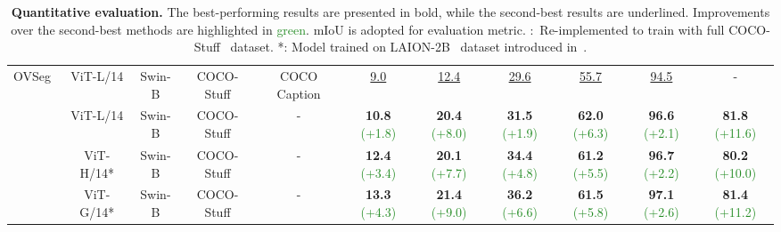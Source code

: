 \documentclass[10pt,twocolumn,letterpaper]{article}
\newcommand{\hlrow}{\rowcolor{black!6}}
\newcommand{\ours}{CAT-Seg\xspace}
\begin{document}
\begin{table*}[!t]
\begin{center}
{\begin{tabular}{l|cccc|cccccc}
        OVSeg~\cite{liang2022open} & ViT-L/14 & Swin-B & COCO-Stuff & COCO Caption & \underline{9.0} & \underline{12.4} & \underline{29.6} & \underline{55.7} & \underline{94.5} & - \\
        \hlrow 
        & ViT-L/14 & Swin-B & COCO-Stuff & -& \textbf{10.8} \textcolor{ForestGreen}{(+1.8)} & \textbf{20.4} \textcolor{ForestGreen}{(+8.0)} & \textbf{31.5} \textcolor{ForestGreen}{(+1.9)} & \textbf{62.0} \textcolor{ForestGreen}{(+6.3)} & \textbf{96.6} \textcolor{ForestGreen}{(+2.1)} & \textbf{81.8} \textcolor{ForestGreen}{(+11.6)}\\
        \hlrow & ViT-H/14* & Swin-B & COCO-Stuff & - & \textbf{12.4} \textcolor{ForestGreen}{(+3.4)} & \textbf{20.1} \textcolor{ForestGreen}{(+7.7)} & \textbf{34.4} \textcolor{ForestGreen}{(+4.8)} & \textbf{61.2} \textcolor{ForestGreen}{(+5.5)} & \textbf{96.7} \textcolor{ForestGreen}{(+2.2)} & \textbf{80.2} \textcolor{ForestGreen}{(+10.0)}\\

        \hlrow \multirow{-3}{*}{\ours (ours)} & ViT-G/14* & Swin-B & COCO-Stuff & - & \textbf{13.3} \textcolor{ForestGreen}{(+4.3)} & \textbf{21.4} \textcolor{ForestGreen}{(+9.0)} & \textbf{36.2} \textcolor{ForestGreen}{(+6.6)} & \textbf{61.5} \textcolor{ForestGreen}{(+5.8)} & \textbf{97.1} \textcolor{ForestGreen}{(+2.6)} & \textbf{81.4} \textcolor{ForestGreen}{(+11.2)}\\
        \bottomrule
    \end{tabular}
    }
    \vspace{-5pt}
    \caption{\textbf{Quantitative evaluation.} The best-performing results are presented in bold, while the second-best results are underlined. Improvements over the second-best methods are highlighted in \textcolor{ForestGreen}{green}. mIoU is adopted for evaluation metric. :~Re-implemented to train with full COCO-Stuff~\cite{caesar2018coco} dataset. *: Model trained on LAION-2B~\cite{schuhmann2022laion} dataset introduced in~\cite{cherti2022reproducible}.
    }\label{tab:main_table}
    \end{center}\vspace{-5pt}
\end{table*}
 
\end{document}
